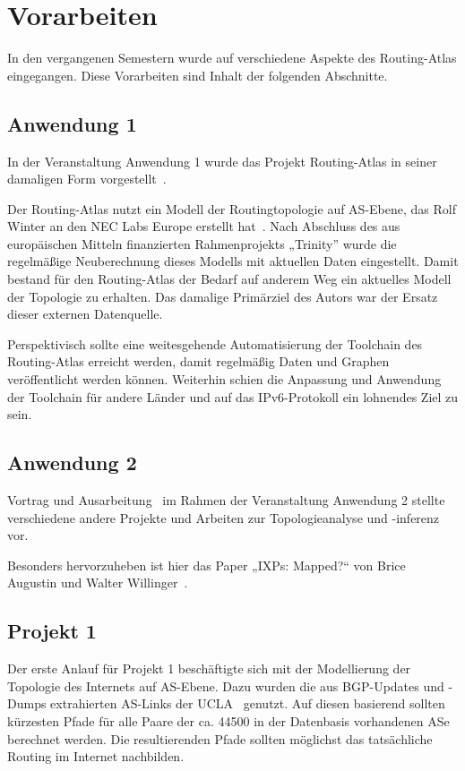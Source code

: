 \section{Vorarbeiten}\label{sec:previous}

In den vergangenen Semestern wurde auf verschiedene Aspekte des Routing-Atlas eingegangen.
Diese Vorarbeiten sind Inhalt der folgenden Abschnitte.

\subsection{Anwendung 1}
In der Veranstaltung Anwendung 1 wurde das Projekt Routing-Atlas in seiner damaligen Form vorgestellt~\cite{KrohnAW1}.

Der Routing-Atlas nutzt ein Modell der Routingtopologie auf AS-Ebene, das Rolf Winter an den NEC Labs Europe erstellt hat~\cite{neclab-topology, Winter:2009:MIR:1577959.1577976}.
Nach Abschluss des aus europäischen Mitteln finanzierten Rahmenprojekts „Trinity” wurde die regelmäßige Neuberechnung dieses Modells mit aktuellen Daten eingestellt.
Damit bestand für den Routing-Atlas der Bedarf auf anderem Weg ein aktuelles Modell der Topologie zu erhalten.
Das damalige Primärziel des Autors war der Ersatz dieser externen Datenquelle.

Perspektivisch sollte eine weitesgehende Automatisierung der Toolchain des Routing-Atlas erreicht werden, damit regelmäßig Daten und Graphen veröffentlicht werden können.
Weiterhin schien die Anpassung und Anwendung der Toolchain für andere Länder und auf das IPv6-Protokoll ein lohnendes Ziel zu sein.

\subsection{Anwendung 2}
Vortrag und Ausarbeitung~\cite{KrohnAW2} im Rahmen der Veranstaltung Anwendung 2 stellte verschiedene andere Projekte und Arbeiten zur Topologieanalyse und -inferenz vor.

Besonders hervorzuheben ist hier das Paper „IXPs: Mapped?“ von Brice Augustin und Walter Willinger~\cite{Augustin:2009:IM:1644893.1644934}.

\subsection{Projekt 1}
Der erste Anlauf für Projekt 1 beschäftigte sich mit der Modellierung der Topologie des Internets auf AS-Ebene.
Dazu wurden die aus BGP-Updates und -Dumps extrahierten AS-Links der UCLA~\cite{ucla-topology, Zhang:2005:CIA:1052812.1052825} genutzt.
Auf diesen basierend sollten kürzesten Pfade für alle Paare der ca. 44500 in der Datenbasis vorhandenen ASe berechnet werden. %
Die resultierenden Pfade sollten möglichst das tatsächliche Routing im Internet nachbilden.

